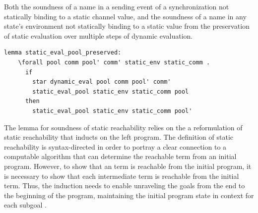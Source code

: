 \documentclass[10pt]{article}
\begin{document}
Both the soundness of a name in a sending event of a synchronization not statically binding
to a static
channel value, and the soundness of a name in any state's environment not statically binding
to a static value from the preservation of static evaluation over multiple steps of dynamic
evaluation.

\begin{lstlisting}[language=logic, mathescape]
  lemma static_eval_pool_preserved:
    \forall pool comm pool' comm' static_env static_comm .
      if
        star dynamic_eval pool comm pool' comm' 
        static_eval_pool static_env static_comm pool
      then
        static_eval_pool static_env static_comm pool'
\end{lstlisting}

The lemma for soundness of static reachability relies on the a reformulation of
static reachability that inducts on the left program.
The definition of static reachability is syntax-directed in
order to portray a clear connection to
a computable algorithm that can determine the reachable term from an initial program.
However, to show that an term is reachable from the initial program, it is necessary to
show that each intermediate term is reachable from the initial term.  Thus, the
induction needs to enable unraveling the goals from the end to the beginning of the program,
maintaining the initial program state in context for each subgoal .
\end{document}
